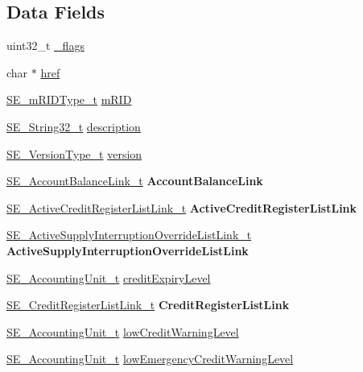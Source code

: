 \subsection*{Data Fields}
\begin{DoxyCompactItemize}
\item 
uint32\+\_\+t \hyperlink{group__Prepayment_gaabf22751d856f247a3f417b5ee94af95}{\+\_\+flags}
\item 
char $\ast$ \hyperlink{group__Prepayment_gaa5be0767476c9086c9dfb595cf50d8cc}{href}
\item 
\hyperlink{group__mRIDType_gac74622112f3a388a2851b2289963ba5e}{S\+E\+\_\+m\+R\+I\+D\+Type\+\_\+t} \hyperlink{group__Prepayment_gaffa073447cfffd53adc271415a6cc365}{m\+R\+ID}
\item 
\hyperlink{group__String32_gac9f59b06b168b4d2e0d45ed41699af42}{S\+E\+\_\+\+String32\+\_\+t} \hyperlink{group__Prepayment_ga875dbbfc5990ea5605a6b10150c00653}{description}
\item 
\hyperlink{group__VersionType_ga4b8d27838226948397ed99f67d46e2ae}{S\+E\+\_\+\+Version\+Type\+\_\+t} \hyperlink{group__Prepayment_ga5eeb01e55108aff758d1ca928fe9172a}{version}
\item 
\hyperlink{structSE__AccountBalanceLink__t}{S\+E\+\_\+\+Account\+Balance\+Link\+\_\+t} {\bfseries Account\+Balance\+Link}
\item 
\hyperlink{structSE__ActiveCreditRegisterListLink__t}{S\+E\+\_\+\+Active\+Credit\+Register\+List\+Link\+\_\+t} {\bfseries Active\+Credit\+Register\+List\+Link}
\item 
\hyperlink{structSE__ActiveSupplyInterruptionOverrideListLink__t}{S\+E\+\_\+\+Active\+Supply\+Interruption\+Override\+List\+Link\+\_\+t} {\bfseries Active\+Supply\+Interruption\+Override\+List\+Link}
\item 
\hyperlink{structSE__AccountingUnit__t}{S\+E\+\_\+\+Accounting\+Unit\+\_\+t} \hyperlink{group__Prepayment_ga8d49cc2f07392b397d2141d692eac22c}{credit\+Expiry\+Level}
\item 
\hyperlink{structSE__CreditRegisterListLink__t}{S\+E\+\_\+\+Credit\+Register\+List\+Link\+\_\+t} {\bfseries Credit\+Register\+List\+Link}
\item 
\hyperlink{structSE__AccountingUnit__t}{S\+E\+\_\+\+Accounting\+Unit\+\_\+t} \hyperlink{group__Prepayment_ga1b2d199f5e15d28b29cd33d216328ef0}{low\+Credit\+Warning\+Level}
\item 
\hyperlink{structSE__AccountingUnit__t}{S\+E\+\_\+\+Accounting\+Unit\+\_\+t} \hyperlink{group__Prepayment_gae5fc43fad2c5429a124db67195f94acb}{low\+Emergency\+Credit\+Warning\+Level}

\end{DoxyCompactItemize}
